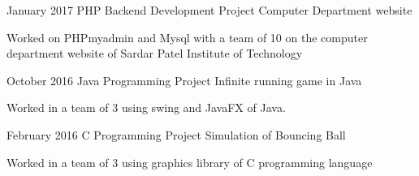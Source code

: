 \documentclass{tccv}
\begin{document}
\begin{eventlist}

\item{January 2017}
     {PHP Backend Development Project}
     {Computer Department website}
     
     Worked on PHPmyadmin and Mysql with a team of 10
     on the computer department website of Sardar Patel Institute
     of Technology

\item{October 2016}
     {Java Programming Project}
     {Infinite running game in Java}
     
     Worked in a team of 3 using swing and JavaFX of Java.

\item{February 2016}
     {C Programming Project}
     {Simulation of Bouncing Ball}
     
     Worked in a team of 3 using graphics library of C
     programming language

\end{eventlist}
\end{document}
